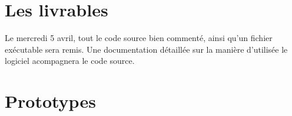 \documentclass[12pt]{article}
\begin{document}
	\section{Les livrables}
		Le mercredi 5 avril, tout le code source bien commenté, ainsi qu'un fichier exécutable sera remis. Une documentation détaillée sur la manière d'utilisée le logiciel acompagnera le code source.

	\section{Prototypes}


	
\end{document}
